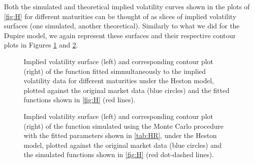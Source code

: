 Both the simulated and theoretical implied volatility curves shown in the plots of \autoref{fig:H} for different maturities can be thought of as slices of implied volatility surfaces (one simulated, another theoretical). Similarly to what we did for the Dupire model, we again represent these surfaces and their respective contour plots in Figures \ref{fig:HS} and \ref{fig:HSSim}.


\begin{figure}[H]
  \begin{subfigmatrix}{2}
  \end{subfigmatrix}
    \caption[Implied volatility surface and corresponding contour plot of the function fitted simmultaneously to the implied volatility data for different maturities under the Heston model, plotted against the original market data and the fitted functions shown in \autoref{fig:H}.]{Implied volatility surface (left) and corresponding contour plot (right) of the function fitted simmultaneously to the implied volatility data for different maturities under the Heston model, plotted against the original market data (blue circles) and the fitted functions shown in \autoref{fig:H} (red lines).}\label{fig:HS}
\end{figure}   


\begin{figure}[H]
  \begin{subfigmatrix}{2}
  \end{subfigmatrix}
    \caption[Implied volatility surface and corresponding contour plot of the function simulated using the Monte Carlo procedure with the fitted parameters shown in \autoref{tab:HR}, under the Heston model, plotted against the original market data and the simulated functions shown in \autoref{fig:H}.]{Implied volatility surface (left) and corresponding contour plot (right) of the function simulated using the Monte Carlo procedure with the fitted parameters shown in \autoref{tab:HR}, under the Heston model, plotted against the original market data (blue circles) and the simulated functions shown in \autoref{fig:H} (red dot-dashed lines).}\label{fig:HSSim}
\end{figure} 


